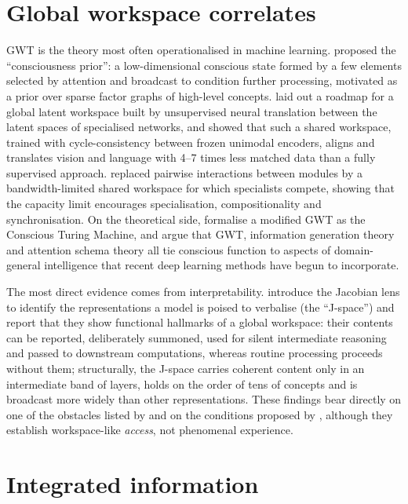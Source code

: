 \documentclass[11pt,a4paper]{article}
\begin{document}
\section{Global workspace correlates}
\label{sec:gwt}

GWT is the theory most often operationalised in machine learning.
\citet{bengio2017consciousness} proposed the ``consciousness prior'': a
low-dimensional conscious state formed by a few elements selected by attention
and broadcast to condition further processing, motivated as a prior over
sparse factor graphs of high-level concepts. \citet{vanrullen2020deep} laid out
a roadmap for a global latent workspace built by unsupervised neural
translation between the latent spaces of specialised networks, and
\citet{devillers2023semi} showed that such a shared workspace, trained with
cycle-consistency between frozen unimodal encoders, aligns and translates
vision and language with 4--7 times less matched data than a fully supervised
approach. \citet{goyal2021coordination} replaced pairwise interactions between
modules by a bandwidth-limited shared workspace for which specialists compete,
showing that the capacity limit encourages specialisation, compositionality and
synchronisation. On the theoretical side, \citet{blum2021theory} formalise a
modified GWT as the Conscious Turing Machine, and \citet{juliani2022link} argue
that GWT, information generation theory and attention schema theory all tie
conscious function to aspects of domain-general intelligence that recent deep
learning methods have begun to incorporate.

The most direct evidence comes from interpretability. \citet{gurnee2026verbalizable}
introduce the Jacobian lens to identify the representations a model is poised
to verbalise (the ``J-space'') and report that they show functional hallmarks
of a global workspace: their contents can be reported, deliberately summoned,
used for silent intermediate reasoning and passed to downstream computations,
whereas routine processing proceeds without them; structurally, the J-space
carries coherent content only in an intermediate band of layers, holds on the
order of tens of concepts and is broadcast more widely than other
representations. These findings bear directly on one of the obstacles listed by
\citet{chalmers2023could} and on the conditions proposed by
\citet{goldstein2024case}, although they establish workspace-like
\emph{access}, not phenomenal experience.

\section{Integrated information}
\label{sec:iit}
\end{document}
